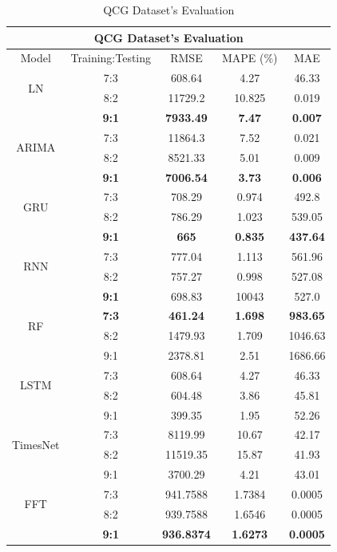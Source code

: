\documentclass{ieeeojies}
\begin{document}
\begin{table}[H]
  \centering
  \begin{tabular}{|c|c|c|c|c|}
         \hline
         \multicolumn{5}{|c|}{\textbf{QCG Dataset's Evaluation}}\\
         \hline
         \centering Model & Training:Testing & RMSE & MAPE (\%) & MAE\\
         \hline
         \multirow{2}{*}{LN} & 7:3 & 608.64 & 4.27 & 46.33 \\ & 8:2 & 11729.2 & 10.825 & 0.019 \\ & \textbf{9:1} & \textbf{7933.49} & \textbf{7.47} & \textbf{0.007}\\
         \hline
         \multirow{2}{*}{ARIMA} & 7:3&11864.3&7.52&0.021\\ & 8:2&8521.33&5.01&0.009 \\ & \textbf{9:1} & \textbf{7006.54} & \textbf{3.73} & \textbf{0.006}\\
         \hline
         \multirow{2}{*}{GRU} & 7:3 & 708.29 & 0.974 & 492.8\\ & 8:2 & 786.29 & 1.023 & 539.05  \\ & \textbf{9:1} & \textbf{665}	& \textbf{0.835} &  \textbf{437.64} \\
         \hline
         \multirow{2}{*}{RNN} & 7:3 &  777.04 &  1.113 & 561.96 \\ & 8:2 &  757.27 & 0.998 &  527.08\\ & \textbf{9:1} & 698.83 & 10043 & 527.0\\
         \hline
         \multirow{2}{*}{RF} & \textbf{7:3}	& \textbf{461.24} & \textbf{1.698} & \textbf{983.65} \\ & 8:2 & 1479.93 & 1.709 & 1046.63 \\ & 9:1 & 2378.81 &  2.51 & 1686.66\\
         \hline
         \multirow{2}{*}{LSTM} & 7:3 & 608.64 & 4.27 & 46.33 \\ & 8:2 & 604.48 & 3.86 & 45.81 \\ & 9:1 & 399.35	&1.95&52.26\\
         \hline
         \multirow{2}{*}{TimesNet} & 7:3 & 8119.99 & 10.67 & 42.17 \\ & 8:2 & 11519.35 & 15.87 & 41.93 \\ & 9:1 & 3700.29	& 4.21 &43.01\\
         \hline
         \multirow{2}{*}{FFT} & 7:3 & 941.7588 &  1.7384 &  0.0005 \\ & 8:2 & 939.7588 &  1.6546 &  0.0005 \\ & \textbf{9:1} & \textbf{936.8374} & \textbf{1.6273} & \textbf{0.0005}\\
         \hline
    \end{tabular}
    \caption{QCG Dataset's Evaluation}
    \label{vcbresult}
\end{table}
\end{document}
